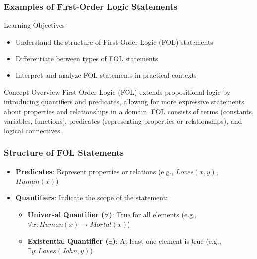 \documentclass[aspectratio=169]{beamer}
\begin{document}
\begin{frame}[fragile]
    \frametitle{Examples of First-Order Logic Statements}
    
    \begin{block}{Learning Objectives}
        \begin{itemize}
            \item Understand the structure of First-Order Logic (FOL) statements
            \item Differentiate between types of FOL statements
            \item Interpret and analyze FOL statements in practical contexts
        \end{itemize}
    \end{block}

    \begin{block}{Concept Overview}
        First-Order Logic (FOL) extends propositional logic by introducing quantifiers
        and predicates, allowing for more expressive statements about properties and
        relationships in a domain. FOL consists of terms (constants, variables, functions),
        predicates (representing properties or relationships), and logical connectives.
    \end{block}
\end{frame}

\begin{frame}[fragile]
    \frametitle{Structure of FOL Statements}
    
    \begin{itemize}
        \item \textbf{Predicates}: Represent properties or relations (e.g., \(Loves(x, y)\), \(Human(x)\))
        \item \textbf{Quantifiers}: Indicate the scope of the statement:
        \begin{itemize}
            \item \textbf{Universal Quantifier (\(\forall\))}: True for all elements (e.g., \(\forall x: Human(x) \rightarrow Mortal(x)\))
            \item \textbf{Existential Quantifier (\(\exists\))}: At least one element is true (e.g., \(\exists y: Loves(John, y)\))
        \end{itemize}
    \end{itemize}
\end{frame}
\end{document}
